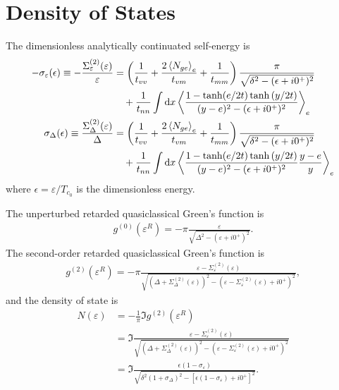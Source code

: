 \documentclass[aps,prl,preprint]{revtex4-2}
\begin{document}
\section{Density of States}

The dimensionless analytically continuated self-energy is
\begin{align}
    - \sigma_\varepsilon(\epsilon) \equiv -\frac{\Sigma^{(2)}_\varepsilon(\varepsilon)}{\varepsilon} & = \left(\frac{1}{t_{vv}} + \frac{2\ev{N_{ge}}_e}{t_{vm}} + \frac{1}{t_{mm}}\right)\frac{\pi}{\sqrt{\delta^2 - (\epsilon+i0^+)^2}} \nonumber \\
                                                                                                     & \quad + \frac{1}{t_{nn}}\int\dd x\ev{\frac{1-\tanh(e/2t)\tanh{(y/2t)}}{(y-e)^2 - (\epsilon+i0^+)^2}}_e \nonumber                            \\
    \sigma_\Delta(\epsilon) \equiv \frac{\Sigma^{(2)}_\Delta(\varepsilon)}{\Delta}                   & = \left(\frac{1}{t_{vv}} + \frac{2\ev{N_{ge}}_e}{t_{vm}} + \frac{1}{t_{mm}}\right)\frac{\pi}{\sqrt{\delta^2 - (\epsilon+i0^+)^2}} \nonumber \\
                                                                                                     & \quad + \frac{1}{t_{nn}}\int\dd x\ev{\frac{1-\tanh(e/2t)\tanh{(y/2t)}}{(y-e)^2 - (\epsilon+i0^+)^2}\frac{y-e}{y}}_e \nonumber               \\
\end{align}
where $\epsilon = \varepsilon / T_{c_0}$ is the dimensionless energy.

The unperturbed retarded quasiclassical Green's function is
\begin{align}
    g^{(0)}(\varepsilon^R)
    = -\pi\frac{\varepsilon}
    {\sqrt{\Delta^2 - (\varepsilon+i0^+)^2}}.
\end{align}
The second-order retarded quasiclassical Green's function is
\begin{align}
    g^{(2)}(\varepsilon^R)
    = -\pi\frac{\varepsilon - \Sigma^{(2)}_\varepsilon(\varepsilon)}
    {\sqrt{(\Delta + \Sigma^{(2)}_\Delta(\varepsilon))^2
            - (\varepsilon - \Sigma^{(2)}_\varepsilon(\varepsilon) + i0^+)^2}},
\end{align}
and the density of state is
\begin{align}
    N(\varepsilon)
     & = -\frac{1}{\pi}\Im{g^{(2)}(\varepsilon^R)}                                                                                   \\
     & = \Im{\frac{\varepsilon - \Sigma^{(2)}_\varepsilon(\varepsilon)}
        {\sqrt{(\Delta + \Sigma^{(2)}_\Delta(\varepsilon))^2
                - (\varepsilon - \Sigma^{(2)}_\varepsilon(\varepsilon) + i0^+)^2}}}                                                  \\
     & = \Im{\frac{\epsilon(1-\sigma_\varepsilon)}{\sqrt{\delta^2(1+\sigma_\Delta)^2 - [\epsilon(1-\sigma_\varepsilon) + i0^+]^2}}}.
\end{align}
\end{document}
